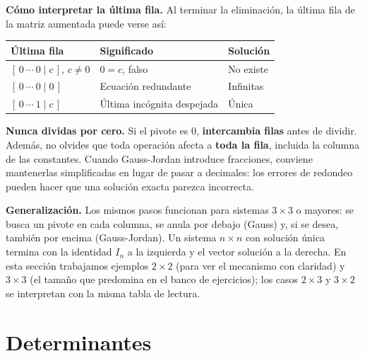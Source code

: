 \documentclass[12pt, letterpaper]{article}
\begin{document}
\begin{cuadroteoria}
  \small
  \textbf{Cómo interpretar la última fila.} Al terminar la eliminación, la
  última fila de la matriz aumentada puede verse así:
  \begin{center}
  \begin{tabular}{@{}lll@{}}
    \toprule
    \textbf{Última fila} & \textbf{Significado} & \textbf{Solución} \\
    \midrule
    $[\,0\ \cdots\ 0\mid c\,]$, $c\neq0$ & $0=c$, falso & No existe \\
    $[\,0\ \cdots\ 0\mid 0\,]$ & Ecuación redundante & Infinitas \\
    $[\,0\ \cdots\ 1\mid c\,]$ & Última incógnita despejada & Única \\
    \bottomrule
  \end{tabular}
  \end{center}
\end{cuadroteoria}

\begin{cuadroadvertencia}
  \small
  \textbf{Nunca dividas por cero.} Si el pivote es $0$, \textbf{intercambia
  filas} antes de dividir. Además, no olvides que toda operación afecta a
  \textbf{toda la fila}, incluida la columna de las constantes. Cuando
  Gauss-Jordan introduce fracciones, conviene mantenerlas simplificadas en
  lugar de pasar a decimales: los errores de redondeo pueden hacer que una
  solución exacta parezca incorrecta.
\end{cuadroadvertencia}

\begin{cuadroextra}
  \small
  \textbf{Generalización.} Los mismos pasos funcionan para sistemas
  $3\times3$ o mayores: se busca un pivote en cada columna, se anula por
  debajo (Gauss) y, si se desea, también por encima (Gauss-Jordan). Un
  sistema $n\times n$ con solución única termina con la identidad $I_n$ a la
  izquierda y el vector solución a la derecha. En esta sección trabajamos
  ejemplos $2\times2$ (para ver el mecanismo con claridad) y $3\times3$ (el
  tamaño que predomina en el banco de ejercicios); los casos $2\times3$ y
  $3\times2$ se interpretan con la misma tabla de lectura.
\end{cuadroextra}

\section{Determinantes}
\end{document}
